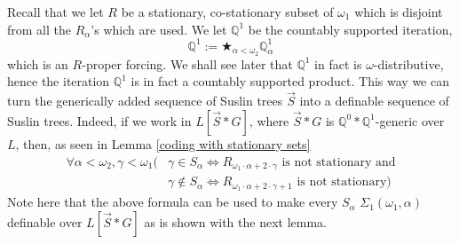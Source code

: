\documentclass[a4paper,12pt]{article}
\newcommand{\forceQ}{\mathbb{Q}}
\begin{document}
Recall that we let $R$ be a stationary, co-stationary subset of $\omega_1$ which is disjoint from all the $R_{\alpha}$'s which are used.  We let $\mathbb{Q}^1$ be the countably supported iteration, $$\mathbb{Q}^1:=\bigstar_{\alpha< \omega_2} \forceQ^1_{\alpha}$$ which is an $R$-proper forcing. We shall see later that $\forceQ^1$ in fact is $\omega$-distributive, hence the iteration $\forceQ^1$ is in fact a countably supported product.
This way we can turn the generically added sequence of Suslin trees $\vec{S}$ into a definable sequence of Suslin trees.
Indeed, if we work in $L[\vec{S}\ast G]$, where $\vec{S} \ast G$ is $\forceQ^0 \ast \mathbb{Q}^1$-generic over $L$, then, as seen in Lemma \ref{coding with stationary sets} 
\begin{align*}
\forall \alpha< \omega_2, \gamma < \omega_1 (&\gamma \in S_{\alpha} \Leftrightarrow R_{\omega_1 \cdot \alpha + 2 \cdot \gamma} \text{ is not stationary and} \\ &
\gamma \notin S_{\alpha} \Leftrightarrow  R_{\omega_1 \cdot \alpha + 2 \cdot \gamma +1} \text{ is not stationary})
\end{align*}
Note here that the above formula can be used to make every $S_{\alpha}$ $\Sigma_1(\omega_1,\alpha)$ definable over $L[\vec{S} \ast G]$ as is shown with the next lemma.
\end{document}
